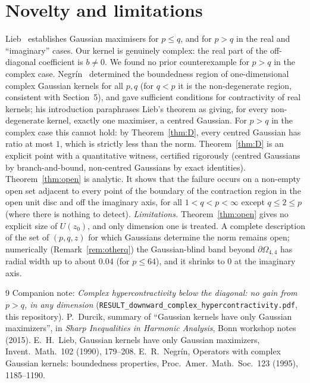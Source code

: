 \documentclass[11pt]{amsart}
\theoremstyle{definition}
\begin{document}
\section{Novelty and limitations}
Lieb~\cite{Lieb90} establishes Gaussian maximisers for $p\le q$, and for $p>q$ in the real and ``imaginary''
cases. Our kernel is genuinely complex: the real part of the off-diagonal coefficient is $b\neq0$. We found no
prior counterexample for $p>q$ in the complex case. Negr\'in~\cite{Negrin95} determined the boundedness region of
one-dimensional complex Gaussian kernels for all $p,q$ (for $q<p$ it is the non-degenerate region, consistent with
Section~5), and gave sufficient conditions for contractivity of real kernels; his introduction paraphrases
Lieb's theorem as giving, for every non-degenerate kernel, exactly one maximiser, a centred Gaussian. For $p>q$ in
the complex case this cannot hold: by Theorem~\ref{thm:D}, every centred Gaussian has ratio at most $1$, which is
strictly less than the norm. Theorem~\ref{thm:D} is an explicit point with a quantitative witness, certified
rigorously (centred Gaussians by branch-and-bound, non-centred Gaussians by exact identities). Theorem~\ref{thm:open}
is analytic. It shows that the failure occurs on a non-empty open set adjacent to every point of the boundary of the
contraction region in the open unit disc and off the imaginary axis, for all $1<q<p<\infty$ except $q\le2\le p$ (where there is nothing to
detect). \emph{Limitations.} Theorem~\ref{thm:open} gives no explicit size of $U(z_0)$, and only dimension one is
treated. A complete description of the set of $(p,q,z)$ for which Gaussians determine the norm remains open;
numerically (Remark~\ref{rem:otherq}) the Gaussian-blind band beyond $\partial\Omega_{4,4}$ has radial width up to
about $0.04$ (for $p\le64$), and it shrinks to $0$ at the imaginary axis.

\begin{thebibliography}{9}
 Companion note: \emph{Complex hypercontractivity below the diagonal: no gain from $p>q$, in any
dimension} (\texttt{RESULT\_downward\_complex\_hypercontractivity.pdf}, this repository).
 P.~Durcik, summary of ``Gaussian kernels have only Gaussian maximizers'', in
\emph{Sharp Inequalities in Harmonic Analysis}, Bonn workshop notes (2015).
 E.~H.~Lieb, Gaussian kernels have only Gaussian maximizers, Invent.\ Math.\ 102 (1990),
179--208.
 E.~R.~Negr\'in, Operators with complex Gaussian kernels: boundedness properties, Proc.\ Amer.\
Math.\ Soc.\ 123 (1995), 1185--1190.
\end{thebibliography}
\end{document}
